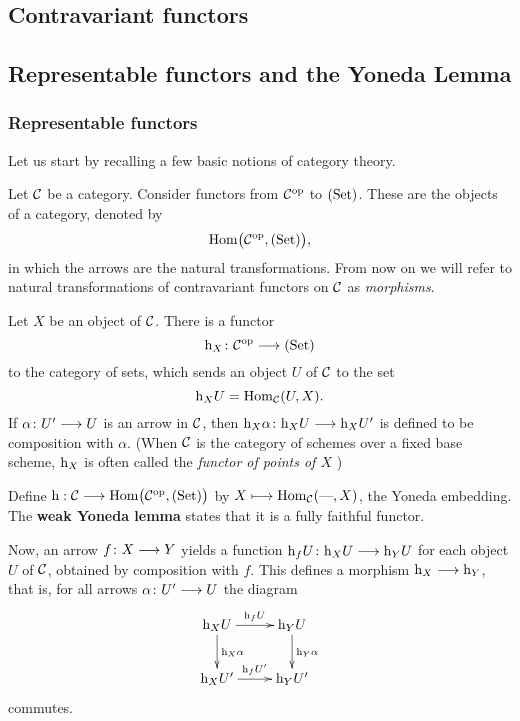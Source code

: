 \begin{2   CONTRAVARIANT FUNCTORS}
\setcounter{chapter}{1}
\chapter{Contravariant functors}\label{ch:functors}

\begin{2.1 Yoneda Lemma}
\setcounter{section}{0}
\section{Representable functors and the Yoneda Lemma}\label{sec:repfunctors}
\setcounter{theorem}{0}


\subsection{Representable functors}
Let us start by recalling a few basic notions of category theory.

Let $\mathcal{C}$ be a category. Consider functors from $\mathcal{C}^{\mathrm{op}}$ to $(\mathrm{Set})$. These are the objects of a category, denoted by
   \[
   \mathrm{Hom}\bigl(\mathcal{C}^{\mathrm{op}}, (\mathrm{Set})\bigr),
   \]
in which the arrows are the natural transformations. From now on we will refer to natural transformations of contravariant functors on $\mathcal{C}$ as \emph{morphisms}.

Let $X$ be an object of $\mathcal{C}$. There is a functor
   \[
   \h_X\colon \cC\op \arr\catset
   \]
to the category of sets, which sends an object $U$ of $\mathcal{C}$ to the set
   \[
   \mathrm{h}_X U = \operatorname{Hom}_{\mathcal{C}}(U, X).
   \] If $\alpha
\colon U' \arr U$ is an arrow in $\mathcal{C}$, then $\h_X \alpha  \colon \h_X U \arr \h_X U'$ is defined to be composition with $\alpha$. (When $\mathcal{C}$ is the category of schemes over a fixed base scheme, $\mathrm{h}_{X}$ is often called the \emph{functor of points of $X$}%
)
\begin{shaded}
Define $\mathrm{h}:\mathcal{C}\longrightarrow\mathrm{Hom}\bigl(\mathcal{C}^{\mathrm{op}}, (\mathrm{Set})\bigr)$ by $X\longmapsto\operatorname{Hom}_{\mathcal{C}}(\textup{---},X)$, the Yoneda embedding. The \textbf{weak Yoneda lemma} states that it is a fully faithful functor.
\end{shaded}

Now, an arrow $f \colon X \arr Y$ yields a function $\h_f U \colon \h_X U \arr \h_Y U$ for each object $U$ of $\mathcal{C}$, obtained by composition with $f$. This defines a morphism $\h_X \arr \h_Y$, that is, for all arrows $\alpha\colon U' \arr U$ the diagram
   \[
   \xymatrix{
   {}\h_X U\ar[r]^{\h_f U} \ar[d]^{\h_X \alpha}
   & {}\h_Y U \ar[d]^{\h_Y \alpha}\\
   {}\h_X U'\ar[r]^{\h_f U'}&{}\h_Y U'\\
   }
   \]
commutes.




\end{2.1 Yoneda Lemma}
\end{2   CONTRAVARIANT FUNCTORS}
